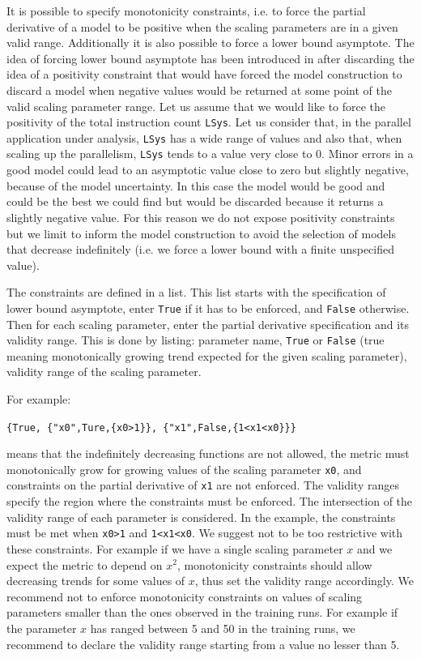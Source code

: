 \documentclass[a4paper, 10pt]{article}
\begin{document}
It is possible to specify monotonicity constraints, i.e. to force the partial derivative of a model to be positive when the scaling
parameters are in a given valid range. Additionally it is also possible to force a lower bound asymptote.
The idea of forcing lower bound asymptote
has been introduced in \ex after discarding the idea of a positivity constraint that would have forced the model construction to discard
a model when negative values would be returned at some point of the valid scaling parameter range. Let us assume that we would like to force
the positivity of the total instruction count \verb!LSys!. Let us consider that, in the parallel application under analysis, \verb!LSys! has
a wide range of values and also that, when scaling up the parallelism, \verb!LSys! tends to a value very close to 0. Minor errors in 
a good model could lead to an asymptotic value close to zero but slightly negative, because of the model uncertainty. In this case the model
would be good and could be the best we could find but would be discarded because it returns a slightly negative value. For this reason
we do not expose positivity constraints but we limit to inform the model construction to avoid the selection of models that decrease indefinitely
(i.e. we force a lower bound with a finite unspecified value).


The constraints are defined in a list. This list starts with the specification of lower bound
asymptote, enter \verb!True! if it has to be enforced, and \verb!False! otherwise.
Then for each scaling parameter, enter the partial derivative specification and its validity range.
This is done by listing: parameter name, \verb!True! or \verb!False!
(true meaning monotonically growing trend expected for the given scaling parameter), validity range of the scaling parameter.

For example:

\verb!{True, {"x0",Ture,{x0>1}}, {"x1",False,{1<x1<x0}}}!

means that the indefinitely decreasing functions are not allowed,
the metric must monotonically grow for growing values of the scaling parameter \verb!x0!, and constraints on the partial derivative
of \verb!x1! are not enforced. The validity ranges specify the region where the constraints must be enforced. The intersection of the validity range
of each parameter is considered. In the example, the constraints must be met when \verb!x0>1! and \verb!1<x1<x0!. We suggest not to be too restrictive
with these constraints. For example if we have a single scaling parameter $x$ and we expect the metric to depend on $x^2$, monotonicity
constraints should allow decreasing trends for some values of $x$, thus set the validity range accordingly.
We recommend not to enforce monotonicity constraints on values of scaling parameters smaller than the ones observed in the training runs.
For example if the parameter $x$ has ranged between 5 and 50 in the training runs,
we recommend to declare the validity range starting from a value no lesser than 5.
\end{document}
